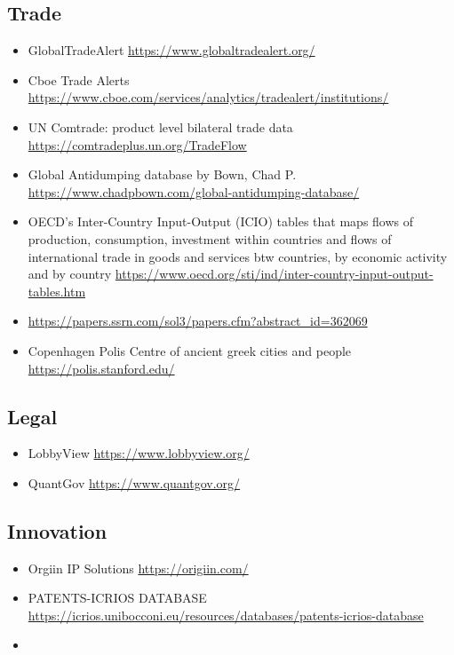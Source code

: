 \documentclass[10pt]{article} %
\begin{document}
    \subsection{Trade}
        \begin{itemize}
            \item GlobalTradeAlert \url{https://www.globaltradealert.org/}
            \item Cboe Trade Alerts \url{https://www.cboe.com/services/analytics/tradealert/institutions/}
            \item UN Comtrade: product level bilateral trade data \url{https://comtradeplus.un.org/TradeFlow}
            \item Global Antidumping database by Bown, Chad P. \url{https://www.chadpbown.com/global-antidumping-database/}
            \item OECD's Inter-Country Input-Output (ICIO) tables that maps flows of production, consumption, investment within countries and flows of international trade in goods and services btw countries, by economic activity and by country \url{https://www.oecd.org/sti/ind/inter-country-input-output-tables.htm}
            \item \cite{FeenstraRomalisSchott2002} \url{https://papers.ssrn.com/sol3/papers.cfm?abstract_id=362069}
            \item Copenhagen Polis Centre of ancient greek cities and people \url{https://polis.stanford.edu/}
        \end{itemize}

    \subsection{Legal}
        \begin{itemize}
        \item LobbyView \url{https://www.lobbyview.org/}
        \item QuantGov \url{https://www.quantgov.org/}
        \end{itemize}
    
    \subsection{Innovation}
        \begin{itemize}
            \item Orgiin IP Solutions \url{https://origiin.com/}
            \item PATENTS-ICRIOS DATABASE \url{https://icrios.unibocconi.eu/resources/databases/patents-icrios-database}
            \item 
        \end{itemize}
    
\end{document}
